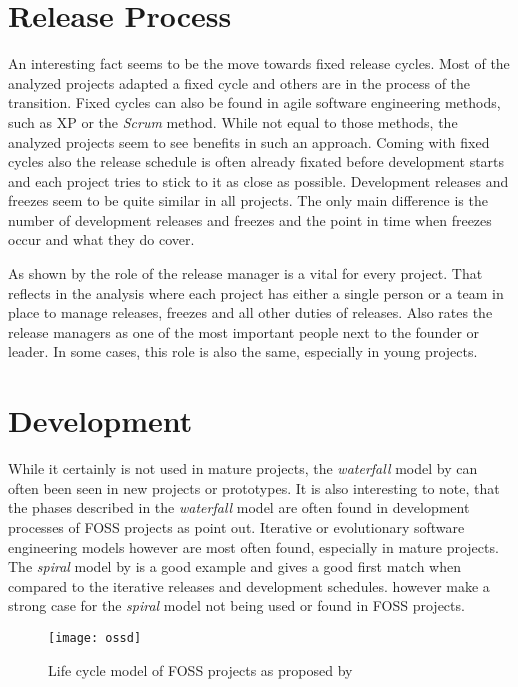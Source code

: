 \section{Release Process} %

An interesting fact seems to be the move towards fixed release cycles. Most of
the analyzed projects adapted a fixed cycle and others are in the process of
the transition. Fixed cycles can also be found in agile software engineering
methods, such as \ac{XP} or the \emph{Scrum} method. While not equal to those
methods, the analyzed projects seem to see benefits in such an approach. Coming
with fixed cycles also the release schedule is often already fixated before
development starts and each project tries to stick to it as close as possible.
Development releases and freezes seem to be quite similar in all projects. The
only main difference is the number of development releases and freezes and the
point in time when freezes occur and what they do cover.

As shown by \textcite{Mockus2002} the role of the release manager is a vital
for every project. That reflects in the analysis where each project has either
a single person or a team in place to manage releases, freezes and all other
duties of releases. Also \textcite{Crowston2005} rates the release managers as
one of the most important people next to the founder or leader. In some cases,
this role is also the same, especially in young projects.


\section{Development} %

While it certainly is not used in mature projects, the \emph{waterfall} model
by \textcite{Royce1970} can often been seen in new projects or prototypes. It
is also interesting to note, that the phases described in the \emph{waterfall}
model are often found in development processes of \ac{FOSS} projects as
\textcite{Roets2007} point out. Iterative or evolutionary software engineering
models however are most often found, especially in mature projects. The
\emph{spiral} model by \textcite{Boehm1988} is a good example and gives a good
first match when compared to the iterative releases and development schedules.
\textcite{Roets2007} however make a strong case for the \emph{spiral} model not
being used or found in \ac{FOSS} projects.

\begin{figure}[htbp]
  \centering
  \texttt{[image: ossd]}
  \caption{Life cycle model of \acl{FOSS} projects as proposed by \textcite{Roets2007}}
\end{figure}

